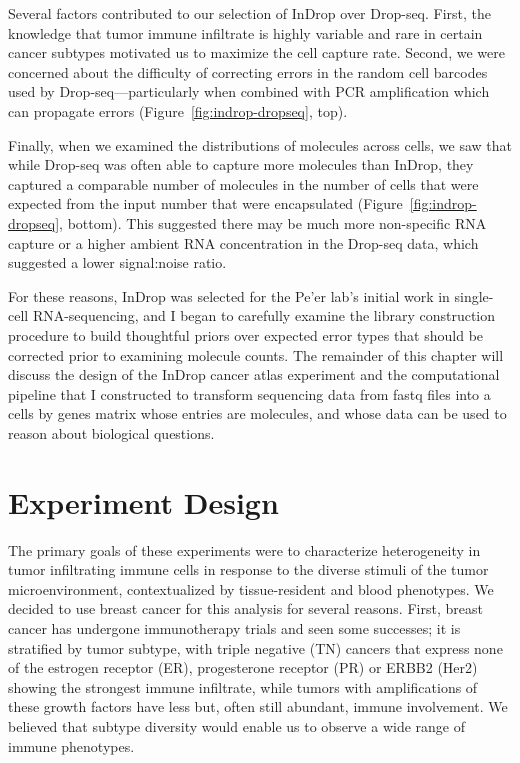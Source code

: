 Several factors contributed to our selection of InDrop over Drop-seq. 
First, the knowledge that tumor immune infiltrate is highly variable and rare in certain cancer subtypes motivated us to maximize the cell capture rate.
Second, we were concerned about the difficulty of correcting errors in the random cell barcodes used by Drop-seq---particularly when combined with PCR amplification which can propagate errors (Figure~\ref{fig:indrop-dropseq}, top). 

Finally, when we examined the distributions of molecules across cells, we saw that while Drop-seq was often able to capture more molecules than InDrop, they captured a comparable number of molecules in the number of cells that were expected from the input number that were encapsulated (Figure~\ref{fig:indrop-dropseq}, bottom). 
This suggested there may be much more non-specific RNA capture or a higher ambient RNA concentration in the Drop-seq data, which suggested a lower signal:noise ratio. 

For these reasons, InDrop was selected for the Pe’er lab’s initial work in single-cell RNA-sequencing, and I began to carefully examine the library construction procedure to build thoughtful priors over expected error types that should be corrected prior to examining molecule counts. 
The remainder of this chapter will discuss the design of the InDrop cancer atlas experiment and the computational pipeline that I constructed to transform sequencing data from fastq files into a cells by genes matrix whose entries are molecules, and whose data can be used to reason about biological questions. 

\section{Experiment Design}

The primary goals of these experiments were to characterize heterogeneity in tumor infiltrating immune cells in response to the diverse stimuli of the tumor microenvironment, contextualized by tissue-resident and blood phenotypes. 
We decided to use breast cancer for this analysis for several reasons.
First, breast cancer has undergone immunotherapy trials and seen some successes; it is stratified by tumor subtype, with triple negative (TN) cancers that express none of the estrogen receptor (ER), progesterone receptor (PR) or ERBB2 (Her2) showing the strongest immune infiltrate, while tumors with amplifications of these growth factors have less but, often still abundant, immune involvement.
We believed that subtype diversity would enable us to observe a wide range of immune phenotypes. 

